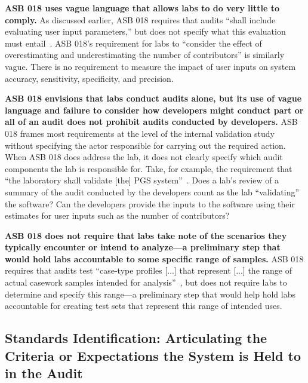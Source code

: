 \textbf{ASB 018 uses vague language that allows labs to do very little to comply.} As discussed earlier, ASB 018 requires that audits ``shall include evaluating user input parameters,'' but does not specify what this evaluation must entail~\cite[R4.1.4]{asb018}. ASB 018's requirement for labs to ``consider the effect of overestimating and underestimating the number of contributors'' is similarly vague. There is no requirement to measure the impact of user inputs on system accuracy, sensitivity, specificity, and precision. 


\textbf{ASB 018 envisions that labs conduct audits alone, but its use of vague language and failure to consider how developers might conduct part or all of an audit does not prohibit audits conducted by developers.} ASB 018 frames most requirements at the level of the internal validation study without specifying the actor responsible for carrying out the required action. When ASB 018 does address the lab, it does not clearly specify which audit components the lab is responsible for. Take, for example, the requirement that ``the laboratory shall validate [the] PGS system''~\cite[R4.1]{asb018}. Does a lab's review of a summary of the audit conducted by the developers count as the lab ``validating'' the software? Can the developers provide the inputs to the software using their estimates for user inputs such as the number of contributors? 


\textbf{ASB 018 does not require that labs take note of the scenarios they typically encounter or intend to analyze---a preliminary step that would hold labs accountable to some specific range of samples.} ASB 018 requires that audits test ``case-type profiles [...] that represent [...] the range of actual casework samples intended for analysis''~\cite[R4.1.3]{asb018}, but does not require labs to determine and specify this range---a preliminary step that would help hold labs accountable for creating test sets that represent this range of intended uses. 



\subsection{Standards Identification: Articulating the Criteria or Expectations the System is Held to in the Audit}
\label{sec:stds}

